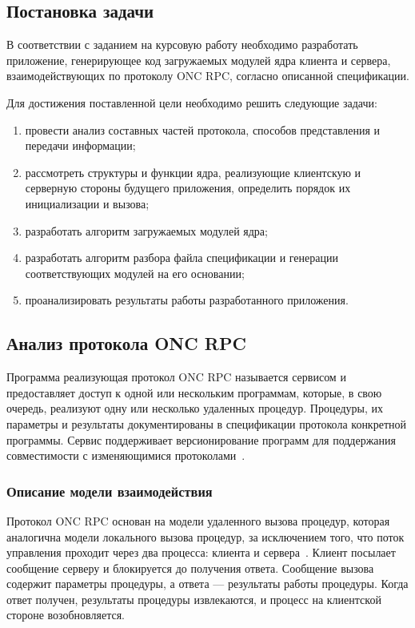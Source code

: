 
\vspace{-1\baselineskip}

\subsection{Постановка задачи}

В соответствии с заданием на курсовую работу необходимо разработать приложение,
генерирующее код загружаемых модулей ядра клиента и сервера, взаимодействующих
по протоколу ONC RPC, согласно описанной спецификации.

Для достижения поставленной цели необходимо решить следующие задачи:
\begin{enumerate}
    \item провести анализ составных частей протокола, способов представления и
          передачи информации;
    \item рассмотреть структуры и функции ядра, реализующие клиентскую и
          серверную стороны будущего приложения, определить порядок их
          инициализации и вызова;
    \item разработать алгоритм загружаемых модулей ядра;
    \item разработать алгоритм разбора файла спецификации и генерации
          соответствующих модулей на его основании;
    \item проанализировать результаты работы разработанного приложения.
\end{enumerate}

\subsection{Анализ протокола ONC RPC}

Программа реализующая протокол ONC RPC называется сервисом и предоставляет
доступ к одной или нескольким программам, которые, в свою очередь, реализуют
одну или несколько удаленных процедур. Процедуры, их параметры и результаты
документированы в спецификации протокола конкретной программы. Сервис
поддерживает версионирование программ для поддержания совместимости с
изменяющимися протоколами~\cite{rfc5531}.

\subsubsection{Описание модели взаимодействия}

Протокол ONC RPC основан на модели удаленного вызова процедур, которая
аналогична модели локального вызова процедур, за исключением того, что поток
управления проходит через два процесса: клиента и сервера~\cite{rfc5531}.
Клиент посылает сообщение серверу и блокируется до получения ответа. Сообщение
вызова содержит параметры процедуры, а ответа --- результаты работы процедуры.
Когда ответ получен, результаты процедуры извлекаются, и процесс на клиентской
стороне возобновляется.

